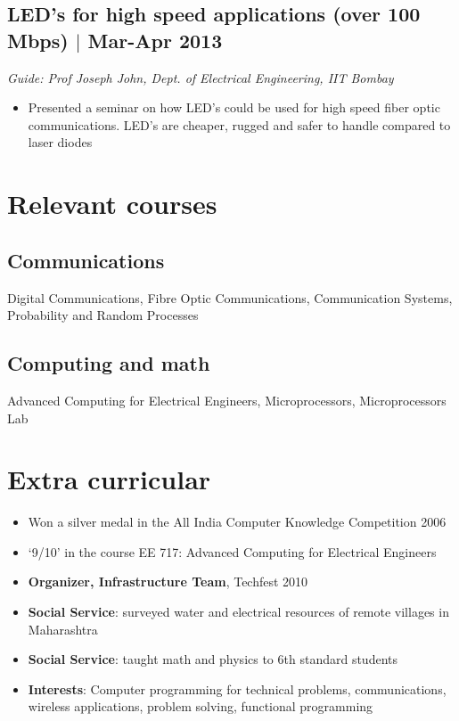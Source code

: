 \documentclass[12pt]{article}
\begin{document}
\subsection*{LED's for high speed applications (over 100 Mbps) $\vert$  Mar-Apr 2013}
\emph{Guide: Prof Joseph John, Dept. of Electrical Engineering, IIT Bombay}  
\begin{itemize}  
\item Presented a seminar on how LED's could be used for high speed fiber optic communications. LED's are cheaper, rugged and safer to handle compared to laser diodes 
\end{itemize}

\section*{Relevant courses}

\subsection*{Communications}
Digital Communications, Fibre Optic Communications, Communication Systems, Probability and Random Processes

\subsection*{Computing and math}
Advanced Computing for Electrical Engineers, Microprocessors, Microprocessors Lab

\section*{Extra curricular}
\begin{itemize}
\item Won a silver medal in the All India Computer Knowledge Competition 2006 
\item `9/10' in the course EE 717: Advanced Computing for Electrical Engineers 
\item \textbf{Organizer, Infrastructure Team}, Techfest 2010 
\item \textbf{Social Service}: surveyed water and electrical resources of remote villages in Maharashtra 
\item \textbf{Social Service}: taught math and physics to 6th standard students 
\item \textbf{Interests}:  Computer programming for technical problems, communications, wireless applications, problem solving, functional programming 
\end{itemize}
\end{document}
